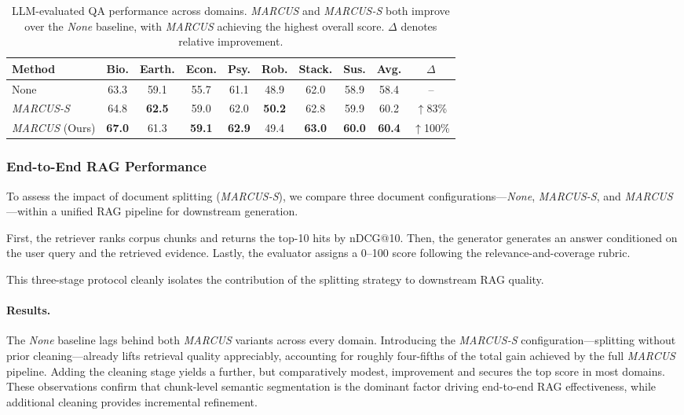 \documentclass[11pt]{article}
\newcommand{\mymethod}{\emph{MARCUS}}
\newcommand{\splits}{\emph{MARCUS-S}}
\begin{document}
\begin{table}[h]
\centering
\footnotesize
\begin{adjustbox}{width=1.0\linewidth}
\begin{tabular}{lccccccccc}
\toprule
\textbf{Method} & Bio. & Earth. & Econ. & Psy. & Rob. & Stack. & Sus. & Avg. & $\Delta$ \\
\midrule
None  & 63.3 & 59.1 & 55.7 & 61.1 & 48.9 & 62.0 & 58.9 & 58.4 & -- \\
\splits{} & 64.8 & \textbf{62.5} & 59.0 & 62.0 & \textbf{50.2} & 62.8 & 59.9 & 60.2 & {\color{red}$\uparrow$83\%} \\
\mymethod{} (Ours)  & \textbf{67.0} & 61.3 & \textbf{59.1} & \textbf{62.9} & 49.4 & \textbf{63.0} & \textbf{60.0} & \textbf{60.4} & {\color{red}$\uparrow$100\%} \\
\bottomrule
\end{tabular}
\end{adjustbox}
\caption{LLM-evaluated QA performance across domains. \mymethod{} and \splits{} both improve over the \textit{None} baseline, with \mymethod{} achieving the highest overall score. $\Delta$ denotes relative improvement.}

\label{tab:end2end-ablation}
\end{table}


\subsubsection{End-to-End RAG Performance}

To assess the impact of document splitting (\splits{}), we compare three document configurations—\emph{None}, \splits{}, and \mymethod{}—within a unified RAG pipeline for downstream generation.


First, the retriever ranks corpus chunks and returns the top-10 hits by nDCG@10.  
Then, the generator generates an answer conditioned on the user query and the retrieved evidence.  
Lastly, the evaluator assigns a 0–100 score following the relevance-and-coverage rubric.

This three-stage protocol cleanly isolates the contribution of the splitting strategy to downstream RAG quality.

\paragraph{Results.}
The \textit{None} baseline lags behind both \mymethod{} variants across every domain.  
Introducing the \splits{} configuration—splitting without prior cleaning—already lifts retrieval quality appreciably, accounting for roughly four-fifths of the total gain achieved by the full \mymethod{} pipeline.  
Adding the cleaning stage yields a further, but comparatively modest, improvement and secures the top score in most domains.  
These observations confirm that chunk‐level semantic segmentation is the dominant factor driving end-to-end RAG effectiveness, while additional cleaning provides incremental refinement.
\end{document}
